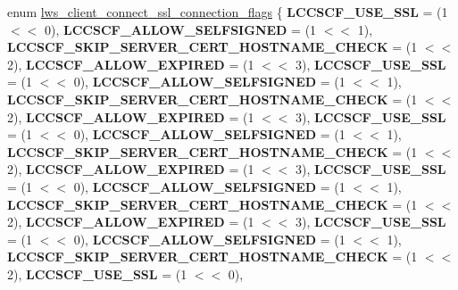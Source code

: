 \begin{DoxyCompactItemize}
\item 
enum \hyperlink{group__client_ga96f3dbad54b2853969cfa933d66871ce}{lws\+\_\+client\+\_\+connect\+\_\+ssl\+\_\+connection\+\_\+flags} \{ \newline
{\bfseries L\+C\+C\+S\+C\+F\+\_\+\+U\+S\+E\+\_\+\+S\+SL} = (1 $<$$<$ 0), 
{\bfseries L\+C\+C\+S\+C\+F\+\_\+\+A\+L\+L\+O\+W\+\_\+\+S\+E\+L\+F\+S\+I\+G\+N\+ED} = (1 $<$$<$ 1), 
{\bfseries L\+C\+C\+S\+C\+F\+\_\+\+S\+K\+I\+P\+\_\+\+S\+E\+R\+V\+E\+R\+\_\+\+C\+E\+R\+T\+\_\+\+H\+O\+S\+T\+N\+A\+M\+E\+\_\+\+C\+H\+E\+CK} = (1 $<$$<$ 2), 
{\bfseries L\+C\+C\+S\+C\+F\+\_\+\+A\+L\+L\+O\+W\+\_\+\+E\+X\+P\+I\+R\+ED} = (1 $<$$<$ 3), 
\newline
{\bfseries L\+C\+C\+S\+C\+F\+\_\+\+U\+S\+E\+\_\+\+S\+SL} = (1 $<$$<$ 0), 
{\bfseries L\+C\+C\+S\+C\+F\+\_\+\+A\+L\+L\+O\+W\+\_\+\+S\+E\+L\+F\+S\+I\+G\+N\+ED} = (1 $<$$<$ 1), 
{\bfseries L\+C\+C\+S\+C\+F\+\_\+\+S\+K\+I\+P\+\_\+\+S\+E\+R\+V\+E\+R\+\_\+\+C\+E\+R\+T\+\_\+\+H\+O\+S\+T\+N\+A\+M\+E\+\_\+\+C\+H\+E\+CK} = (1 $<$$<$ 2), 
{\bfseries L\+C\+C\+S\+C\+F\+\_\+\+A\+L\+L\+O\+W\+\_\+\+E\+X\+P\+I\+R\+ED} = (1 $<$$<$ 3), 
\newline
{\bfseries L\+C\+C\+S\+C\+F\+\_\+\+U\+S\+E\+\_\+\+S\+SL} = (1 $<$$<$ 0), 
{\bfseries L\+C\+C\+S\+C\+F\+\_\+\+A\+L\+L\+O\+W\+\_\+\+S\+E\+L\+F\+S\+I\+G\+N\+ED} = (1 $<$$<$ 1), 
{\bfseries L\+C\+C\+S\+C\+F\+\_\+\+S\+K\+I\+P\+\_\+\+S\+E\+R\+V\+E\+R\+\_\+\+C\+E\+R\+T\+\_\+\+H\+O\+S\+T\+N\+A\+M\+E\+\_\+\+C\+H\+E\+CK} = (1 $<$$<$ 2), 
{\bfseries L\+C\+C\+S\+C\+F\+\_\+\+A\+L\+L\+O\+W\+\_\+\+E\+X\+P\+I\+R\+ED} = (1 $<$$<$ 3), 
\newline
{\bfseries L\+C\+C\+S\+C\+F\+\_\+\+U\+S\+E\+\_\+\+S\+SL} = (1 $<$$<$ 0), 
{\bfseries L\+C\+C\+S\+C\+F\+\_\+\+A\+L\+L\+O\+W\+\_\+\+S\+E\+L\+F\+S\+I\+G\+N\+ED} = (1 $<$$<$ 1), 
{\bfseries L\+C\+C\+S\+C\+F\+\_\+\+S\+K\+I\+P\+\_\+\+S\+E\+R\+V\+E\+R\+\_\+\+C\+E\+R\+T\+\_\+\+H\+O\+S\+T\+N\+A\+M\+E\+\_\+\+C\+H\+E\+CK} = (1 $<$$<$ 2), 
{\bfseries L\+C\+C\+S\+C\+F\+\_\+\+A\+L\+L\+O\+W\+\_\+\+E\+X\+P\+I\+R\+ED} = (1 $<$$<$ 3), 
\newline
{\bfseries L\+C\+C\+S\+C\+F\+\_\+\+U\+S\+E\+\_\+\+S\+SL} = (1 $<$$<$ 0), 
{\bfseries L\+C\+C\+S\+C\+F\+\_\+\+A\+L\+L\+O\+W\+\_\+\+S\+E\+L\+F\+S\+I\+G\+N\+ED} = (1 $<$$<$ 1), 
{\bfseries L\+C\+C\+S\+C\+F\+\_\+\+S\+K\+I\+P\+\_\+\+S\+E\+R\+V\+E\+R\+\_\+\+C\+E\+R\+T\+\_\+\+H\+O\+S\+T\+N\+A\+M\+E\+\_\+\+C\+H\+E\+CK} = (1 $<$$<$ 2), 
{\bfseries L\+C\+C\+S\+C\+F\+\_\+\+U\+S\+E\+\_\+\+S\+SL} = (1 $<$$<$ 0), 
\newline

\end{DoxyCompactItemize}
